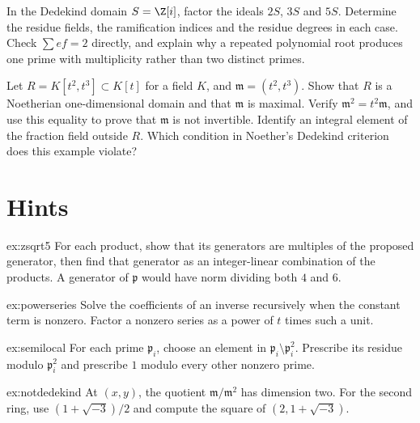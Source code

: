 \begin{exercise}[$\star\star$]\label{ex:v10new-ch06-gaussian}
In the Dedekind domain $S=\Z[i]$, factor the ideals $2S$, $3S$ and $5S$. Determine the residue fields, the ramification indices and the residue degrees in each case. Check $\sum ef=2$ directly, and explain why a repeated polynomial root produces one prime with multiplicity rather than two distinct primes.
\end{exercise}

\begin{exercise}[$\star\star\star$]\label{ex:v10new-ch06-cusp}
Let $R=K[t^2,t^3]\subset K[t]$ for a field $K$, and $\mathfrak m=(t^2,t^3)$. Show that $R$ is a Noetherian one-dimensional domain and that $\mathfrak m$ is maximal. Verify $\mathfrak m^2=t^2\mathfrak m$, and use this equality to prove that $\mathfrak m$ is not invertible. Identify an integral element of the fraction field outside $R$. Which condition in Noether's Dedekind criterion does this example violate?
\end{exercise}

\section{Hints}

\begin{hint}{ex:zsqrt5}
For each product, show that its generators are multiples of the proposed generator, then find that generator as an integer-linear combination of the products. A generator of $\mathfrak p$ would have norm dividing both $4$ and $6$.
\end{hint}

\begin{hint}{ex:powerseries}
Solve the coefficients of an inverse recursively when the constant term is nonzero. Factor a nonzero series as a power of $t$ times such a unit.
\end{hint}

\begin{hint}{ex:semilocal}
For each prime $\mathfrak p_i$, choose an element in $\mathfrak p_i\setminus\mathfrak p_i^2$. Prescribe its residue modulo $\mathfrak p_i^2$ and prescribe $1$ modulo every other nonzero prime.
\end{hint}

\begin{hint}{ex:notdedekind}
At $(x,y)$, the quotient $\mathfrak m/\mathfrak m^2$ has dimension two. For the second ring, use $(1+\sqrt{-3})/2$ and compute the square of $(2,1+\sqrt{-3})$.
\end{hint}

